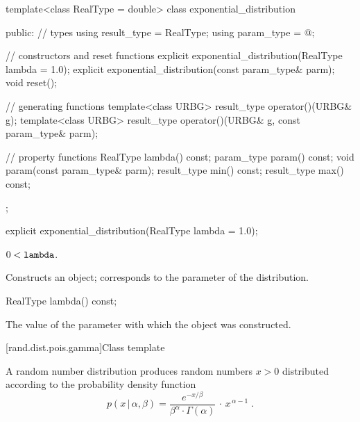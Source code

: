%
\begin{codeblock}
template<class RealType = double>
  class exponential_distribution {
  public:
    // types
    using result_type = RealType;
    using param_type  = @\unspec@;

    // constructors and reset functions
    explicit exponential_distribution(RealType lambda = 1.0);
    explicit exponential_distribution(const param_type& parm);
    void reset();

    // generating functions
    template<class URBG>
      result_type operator()(URBG& g);
    template<class URBG>
      result_type operator()(URBG& g, const param_type& parm);

    // property functions
    RealType lambda() const;
    param_type param() const;
    void param(const param_type& parm);
    result_type min() const;
    result_type max() const;
  };
\end{codeblock}


%
\begin{itemdecl}
explicit exponential_distribution(RealType lambda = 1.0);
\end{itemdecl}

\begin{itemdescr}
\pnum\requires
 $ 0 < \texttt{lambda} $.

\pnum\effects Constructs an  object;
 corresponds to the parameter of the distribution.
\end{itemdescr}

%
\begin{itemdecl}
RealType lambda() const;
\end{itemdecl}

\begin{itemdescr}
\pnum\returns The value of the  parameter
 with which the object was constructed.
\end{itemdescr}


[rand.dist.pois.gamma]{Class template }%
%
%

\pnum
A  random number distribution
produces random numbers $x > 0$
distributed according to
the probability density function%
%
%
\[%
 p(x\,|\,\alpha,\beta)
      = \frac{e^{-x/\beta}}{\beta^{\alpha} \cdot \Gamma(\alpha)}
        \, \cdot \, x^{\, \alpha-1}
\; \mbox{.}
\]

